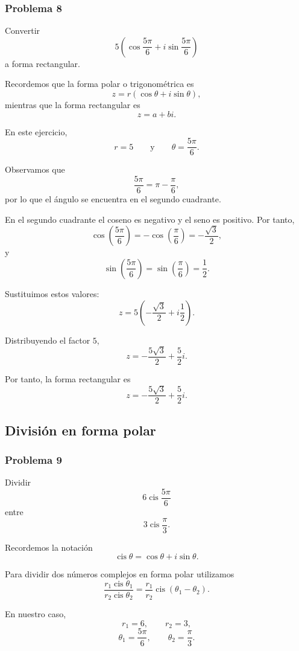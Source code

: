 \documentclass[12pt]{article}
\begin{document}
\subsubsection*{Problema 8}

Convertir
\[
5\left(
\cos\frac{5\pi}{6}
+i\sin\frac{5\pi}{6}
\right)
\]
a forma rectangular.

Recordemos que la forma polar o trigonométrica es
\[
z=r(\cos\theta+i\sin\theta),
\]
mientras que la forma rectangular es
\[
z=a+bi.
\]

En este ejercicio,
\[
r=5
\qquad\text{y}\qquad
\theta=\frac{5\pi}{6}.
\]

Observamos que
\[
\frac{5\pi}{6}
=
\pi-\frac{\pi}{6},
\]
por lo que el ángulo se encuentra en el segundo cuadrante.

En el segundo cuadrante el coseno es negativo y el seno es positivo.
Por tanto,
\[
\cos\left(\frac{5\pi}{6}\right)
=
-\cos\left(\frac{\pi}{6}\right)
=
-\frac{\sqrt3}{2},
\]
y
\[
\sin\left(\frac{5\pi}{6}\right)
=
\sin\left(\frac{\pi}{6}\right)
=
\frac12.
\]

Sustituimos estos valores:
\[
z
=
5\left(
-\frac{\sqrt3}{2}
+i\frac12
\right).
\]

Distribuyendo el factor $5$,
\[
z
=
-\frac{5\sqrt3}{2}
+
\frac52i.
\]

Por tanto, la forma rectangular es
\[
\boxed{
z=-\frac{5\sqrt3}{2}+\frac52i
}.
\]

\subsection{División en forma polar}

\subsubsection*{Problema 9}

Dividir
\[
6\operatorname{cis}\frac{5\pi}{6}
\]
entre
\[
3\operatorname{cis}\frac{\pi}{3}.
\]

Recordemos la notación
\[
\operatorname{cis}\theta
=
\cos\theta+i\sin\theta.
\]

Para dividir dos números complejos en forma polar utilizamos
\[
\frac{r_1\operatorname{cis}\theta_1}
     {r_2\operatorname{cis}\theta_2}
=
\frac{r_1}{r_2}
\operatorname{cis}(\theta_1-\theta_2).
\]

En nuestro caso,
\[
r_1=6,
\qquad
r_2=3,
\]
\[
\theta_1=\frac{5\pi}{6},
\qquad
\theta_2=\frac{\pi}{3}.
\]
\end{document}
